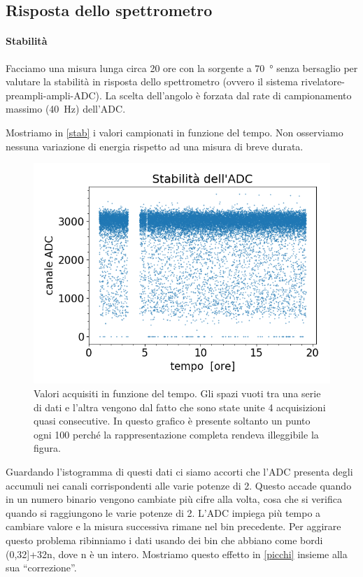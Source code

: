 \subsection{Risposta dello spettrometro}

\paragraph{Stabilità} Facciamo una misura lunga circa 20 ore con la sorgente a \SI{70}{\degree} senza bersaglio per valutare la stabilità in risposta dello spettrometro (ovvero il sistema rivelatore-preampli-ampli-ADC).
La scelta dell'angolo è forzata dal rate di campionamento massimo (\SI{40}{Hz}) dell'ADC.

Mostriamo in \autoref{stab} i valori campionati in funzione del tempo. Non osserviamo nessuna variazione di energia rispetto ad una misura di breve durata.

\begin{figure}[h]
\centering
\includegraphics[width=30 em]{immagini/stab.png}
\caption{Valori acquisiti in funzione del tempo. Gli spazi vuoti tra una serie di dati e l'altra vengono dal fatto che sono state unite 4 acquisizioni quasi consecutive.
In questo grafico è presente soltanto un punto ogni 100 perché la rappresentazione completa rendeva illeggibile la figura.}
\label{stab}
\end{figure}

Guardando l'istogramma di questi dati ci siamo accorti che l'ADC presenta degli accumuli nei canali corrispondenti alle varie potenze di 2. Questo accade quando in un numero binario vengono cambiate più cifre alla volta, cosa che si verifica quando si raggiungono le varie potenze di 2. L'ADC impiega più tempo a cambiare valore e la misura successiva rimane nel bin precedente.
Per aggirare questo problema ribinniamo i dati usando dei bin che abbiano come bordi (0,32]+32n, dove n è un intero. Mostriamo questo effetto in \autoref{picchi} insieme alla sua ``correzione''.

